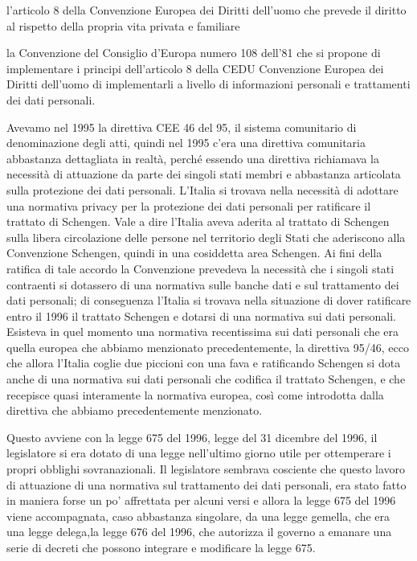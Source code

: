 l'articolo 8 della Convenzione Europea dei Diritti dell'uomo che prevede il diritto al rispetto della propria vita privata e familiare

la Convenzione del Consiglio d'Europa numero 108 dell'81 che si propone di implementare i principi dell'articolo 8 della CEDU Convenzione Europea dei Diritti dell'uomo di implementarli a livello di informazioni personali e trattamenti dei dati personali. 

Avevamo nel 1995 la direttiva CEE 46 del 95, il sistema comunitario di denominazione degli atti, quindi nel 1995 c'era una direttiva comunitaria abbastanza dettagliata in realtà, perché essendo una direttiva richiamava la necessità di attuazione da parte dei singoli stati membri e abbastanza articolata sulla protezione dei dati personali. 
L'Italia si trovava nella necessità di adottare una normativa privacy per la protezione dei dati personali per ratificare il trattato di Schengen. Vale a dire l'Italia aveva aderita al trattato di Schengen sulla libera circolazione delle persone nel territorio degli Stati che aderiscono alla Convenzione Schengen, quindi in una cosiddetta area Schengen. Ai fini della ratifica di tale accordo la Convenzione prevedeva la necessità che i singoli stati contraenti si dotassero di una normativa sulle banche dati e sul trattamento dei dati personali; di conseguenza l'Italia si trovava nella situazione di dover ratificare entro il 1996 il trattato Schengen e dotarsi di una normativa sui dati personali. 
Esisteva in quel momento una normativa recentissima  sui dati personali che era quella europea che abbiamo menzionato precedentemente, la direttiva 95/46, ecco che allora l'Italia coglie due piccioni con una fava e ratificando Schengen si dota anche di una normativa sui dati personali che codifica il trattato Schengen, e che recepisce quasi interamente la normativa europea, così come introdotta dalla direttiva che abbiamo precedentemente menzionato. 

Questo avviene con la legge 675 del 1996, legge del 31 dicembre del 1996, il legislatore si era dotato di una legge nell'ultimo giorno utile per ottemperare i propri obblighi sovranazionali.
Il legislatore sembrava cosciente che questo lavoro di attuazione di una normativa sul trattamento dei dati personali, era stato fatto in maniera forse un po' affrettata per alcuni versi e allora la legge 675 del 1996 viene accompagnata, caso abbastanza singolare, da una legge gemella, che era una legge delega,la legge 676 del 1996, che autorizza il governo a emanare una serie di decreti che possono integrare e modificare la legge 675. 

